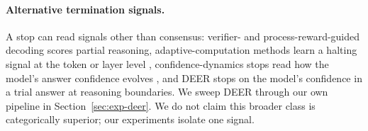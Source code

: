 \paragraph{Alternative termination signals.}
A stop can read signals other than consensus: verifier- and
process-reward-guided decoding \citep{lightman2024verify,wang2024mathshepherd}
scores partial reasoning, adaptive-computation methods learn a halting signal
at the token or layer level \citep{graves2016act,schuster2022confident},
confidence-dynamics stops read how the model's answer confidence evolves
\citep{hosseini2026codestop}, and DEER \citep{deer} stops on the model's
confidence in a trial answer at reasoning boundaries. We sweep DEER through our
own pipeline in Section~\ref{sec:exp-deer}. We do not claim this broader class
is categorically superior; our experiments isolate one signal.
